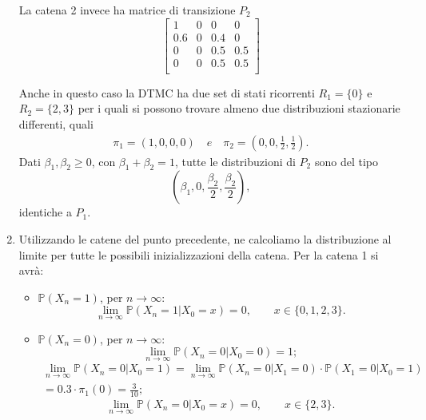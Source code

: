 \documentclass[12pt]{homework}
\begin{document}
\begin{enumerate}
La catena 2 invece ha matrice di transizione $P_2$ 
  \[\begin{bmatrix}
        1 & 0 & 0 & 0\\
        0.6 & 0 & 0.4 & 0\\ 
        0 & 0 & 0.5 & 0.5\\
        0 & 0 & 0.5 & 0.5\\
      \end{bmatrix}\]

Anche in questo caso la DTMC ha due set di stati  ricorrenti $R_1 = \{0\}$ e $R_2 = \{2,3\}$ per i quali si possono trovare almeno due distribuzioni stazionarie differenti, quali
\begin{align*}
\pi_1 = (1, 0, 0, 0)\,\,\,\,\,\,e\,\,\,\,\,\, \pi_2= (0, 0, \frac{1}{2}, \frac{1}{2}).
\end{align*}
Dati $\beta_1, \beta_2 \geq 0$, con $\beta_1+\beta_2 = 1$, tutte le distribuzioni di $P_2$ sono del tipo 
\[(\beta_1, 0, \frac{\beta_2}{2}, \frac{\beta_2}{2}),\]identiche a $P_1$. 
  
     
\newpage
\item
Utilizzando le catene del punto precedente, ne calcoliamo la distribuzione al limite per tutte le possibili inizializzazioni della catena. Per la catena 1 si avrà: 

\begin{itemize}
\item
$\mathbb{P}(X_n = 1)$, per $n \rightarrow \infty$: 
\[ \lim_{n \to \infty} \mathbb{P}(X_n= 1 \lvert X_0 = x) = 0, \quad\quad x \in \{0,1,2,3\}. \]
\item
$\mathbb{P}(X_n = 0)$, per $n \rightarrow \infty$: 
\[\lim_{n \to \infty} \mathbb{P}(X_n=0 \lvert X_0 = 0) = 1;\]
\begin{multline*}
\lim_{n \to \infty} \mathbb{P}(X_n=0 \lvert X_0 = 1)= \lim_{n \to \infty} \mathbb{P}(X_n=0 \lvert X_1 = 0)\cdot\mathbb{P}(X_1=0 \lvert X_0 = 1)\\
= 0.3\cdot \pi_1(0) = \frac{3}{10};
\end{multline*} 
\[\lim_{n \to \infty} \mathbb{P}(X_n=0 \lvert X_0= x) = 0, \quad\quad x \in \{2,3\}. \]


\end{itemize}
\end{enumerate}
\end{document}

